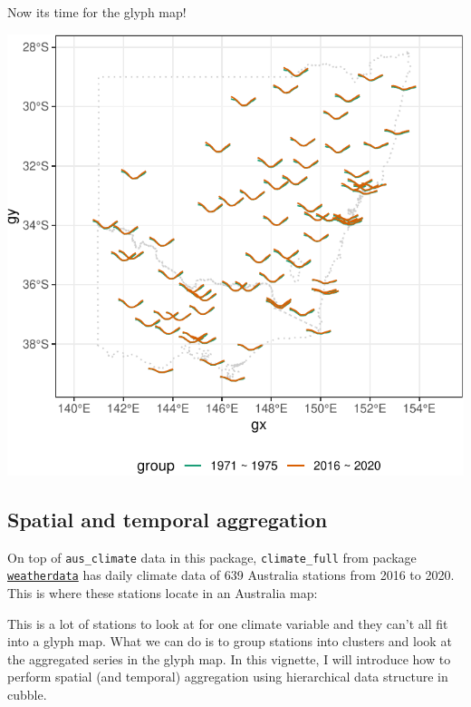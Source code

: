 \documentclass[
]{jss}
\begin{document}
Now its time for the glyph map!

\begin{CodeChunk}


\begin{center}\includegraphics{figures/unnamed-chunk-10-1} \end{center}

\end{CodeChunk}

\hypertarget{spatial-and-temporal-aggregation}{%
\subsection{Spatial and temporal
aggregation}\label{spatial-and-temporal-aggregation}}

On top of \texttt{aus\_climate} data in this package,
\texttt{climate\_full} from package
\href{https://github.com/huizezhang-sherry/weatherdata}{\texttt{weatherdata}}
has daily climate data of 639 Australia stations from 2016 to 2020. This
is where these stations locate in an Australia map:

This is a lot of stations to look at for one climate variable and they
can't all fit into a glyph map. What we can do is to group stations into
clusters and look at the aggregated series in the glyph map. In this
vignette, I will introduce how to perform spatial (and temporal)
aggregation using hierarchical data structure in cubble.
\end{document}
